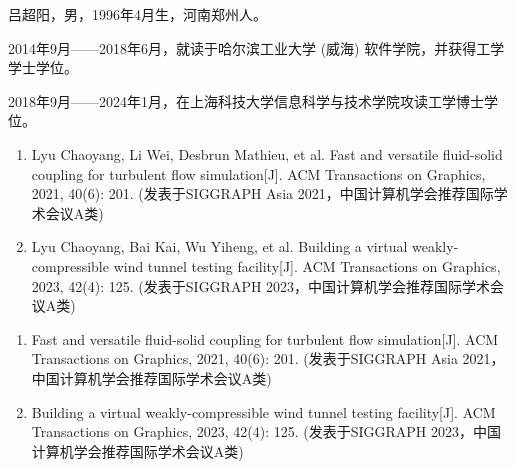 \documentclass[doctor]{shtthesis}
\makeatletter
\def\ifgraduate{\ifsht@graduate}
\makeatother
\begin{document}
\maketitle

\frontmatter


\makeindices

\ifgraduate

\fi

\mainmatter








\makebiblio

\backmatter


\ifgraduate
\begin{resume}
  吕超阳，男，1996年4月生，河南郑州人。

  2014年9月——2018年6月，就读于哈尔滨工业大学 (威海) 软件学院，并获得工学学士学位。

  2018年9月——2024年1月，在上海科技大学信息科学与技术学院攻读工学博士学位。  
\end{resume}

\begin{publications}
  \begin{enumerate}
    \item Lyu Chaoyang, Li Wei, Desbrun Mathieu, et al. Fast and versatile fluid-solid coupling for turbulent flow simulation[J]. ACM Transactions on Graphics, 2021, 40(6): 201. (发表于SIGGRAPH Asia 2021，中国计算机学会推荐国际学术会议A类)
    \item Lyu Chaoyang, Bai Kai, Wu Yiheng, et al. Building a virtual weakly-compressible wind tunnel testing facility[J]. ACM Transactions on Graphics, 2023, 42(4): 125. (发表于SIGGRAPH 2023，中国计算机学会推荐国际学术会议A类)
  \end{enumerate}
\end{publications}

\begin{publications*}
  \begin{enumerate}
    \item Fast and versatile fluid-solid coupling for turbulent flow simulation[J]. ACM Transactions on Graphics, 2021, 40(6): 201. (发表于SIGGRAPH Asia 2021，中国计算机学会推荐国际学术会议A类)
    \item Building a virtual weakly-compressible wind tunnel testing facility[J]. ACM Transactions on Graphics, 2023, 42(4): 125. (发表于SIGGRAPH 2023，中国计算机学会推荐国际学术会议A类)
  \end{enumerate}
\end{publications*}



\fi
\end{document}

